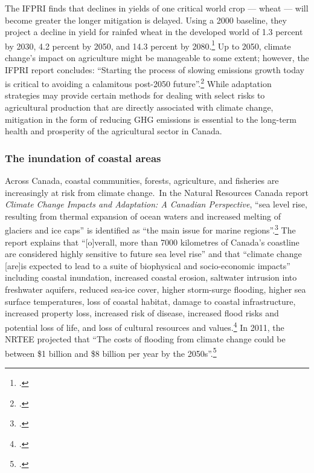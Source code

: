 The IFPRI finds that declines in yields of one critical world crop --- wheat --- will become greater the longer mitigation is delayed. 
Using a 2000 baseline, they project a decline in yield for rainfed wheat in the developed world of 1.3 percent by 2030, 4.2 percent by 2050, and 14.3 percent by 2080.\footcite[][p. 85]{Farming2050}
Up to 2050, climate change's impact on agriculture might be manageable to some extent; however, the IFPRI report concludes: ``Starting the process of slowing emissions growth today is critical to avoiding a calamitous post-2050 future''.\footcite[][p. xxi]{Farming2050}
While adaptation strategies may provide certain methods for dealing with select risks to agricultural production that are directly associated with climate change, mitigation in the form of reducing GHG emissions is essential to the long-term health and prosperity of the agricultural sector in Canada.



	\subsubsection{The inundation of coastal areas}
	\label{sec:inundationcoastal}

	
	
Across Canada, coastal communities, forests, agriculture, and fisheries are increasingly at risk from climate change.\
In the Natural Resources Canada report \emph{Climate Change Impacts and Adaptation: A Canadian Perspective}, ``sea level rise, resulting from thermal expansion of ocean waters and increased melting of glaciers and ice caps'' is identified as ``the main issue for marine regions''.\footcite[][p. xvi]{Lemmen2010}
The report explains that ``[o]verall, more than 7000 kilometres of Canada's coastline are considered highly sensitive to future sea level rise'' and that ``climate change [are]is expected to lead to a suite of biophysical and socio-economic impacts'' including coastal inundation, increased coastal erosion, saltwater intrusion into freshwater aquifers, reduced sea-ice cover, higher storm-surge flooding, higher sea surface temperatures, loss of coastal habitat, damage to coastal infrastructure, increased property loss, increased risk of disease, increased flood risks and potential loss of life, and loss of cultural resources and values.\footcite[][p. xvii]{Lemmen2010}
In 2011, the NRTEE projected that ``The costs of flooding from climate change could be between \$1 billion and \$8 billion per year by the 2050s''.\footcite[][p.16]{NRTEEPrice}



